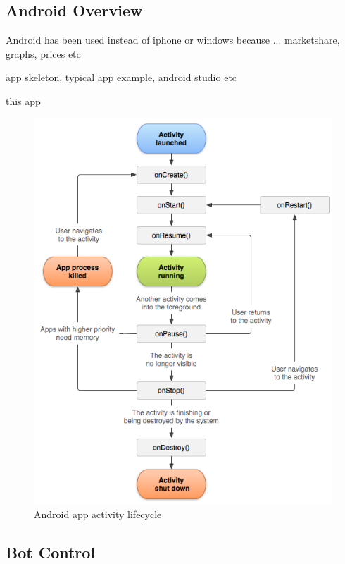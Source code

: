 \subsection{Android Overview}

Android has been used instead of iphone or windows because ... marketshare, graphs, prices etc


app skeleton, typical app example, android studio etc


this app





\begin{figure}[H]
      \centering
      \includegraphics[scale=.8]{images/Diagrams/android_activity_lifecycle.png}
      \caption{Android app activity lifecycle }
      \label{androidActivity}
  \end{figure}
  \bigskip


\subsection{Bot Control}

